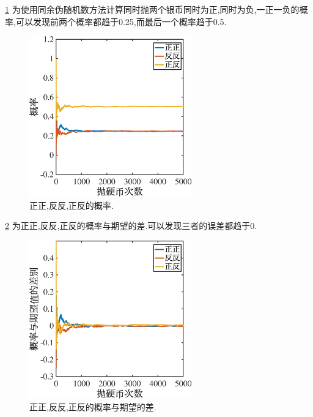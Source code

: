 \documentclass[12pt]{article}
\begin{document}
\cref{fig:3} 为使用同余伪随机数方法计算同时抛两个银币同时为正,同时为负,一正一负的概率,可以发现前两个概率都趋于0.25,而最后一个概率趋于0.5.

\begin{figure}[htp]
	\centering
	\includegraphics[width=7cm]{posi3.eps}
	\caption{正正,反反,正反的概率.}
	\label{fig:3}
\end{figure}

\cref{fig:4} 为正正,反反,正反的概率与期望的差.可以发现三者的误差都趋于0.

\begin{figure}[htp]
	\centering
	\includegraphics[width=7cm]{posi4.eps}
	\caption{正正,反反,正反的概率与期望的差.}
	\label{fig:4}
\end{figure}






\end{document}
